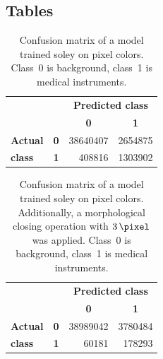 
\clearpage\onecolumn
\begin{appendices}
\section{Tables}

\begin{table}[ht]
    \centering
    \begin{tabular}{llrr}
    \toprule
    ~                & ~ & \multicolumn{2}{c}{\textbf{Predicted class}}\\
    ~                & ~ & \multicolumn{1}{c}{\textbf{0}} & \multicolumn{1}{c}{\textbf{1}} \\%
    \textbf{Actual}  & \multicolumn{1}{c}{\textbf{0}} & \num{38640407}  & \num{2654875} \\
    \textbf{class}   & \multicolumn{1}{c}{\textbf{1}} &   \num{408816}  & \num{1303902} \\ \bottomrule
    \end{tabular}
    \caption{Confusion matrix of a model trained soley on pixel colors.
             Class~0 is background, class~1 is medical instruments.}
    \label{table:cm-model-301}
\end{table}

\begin{table}[ht]
    \centering
    \begin{tabular}{llrr}
    \toprule
    ~                & ~ & \multicolumn{2}{c}{\textbf{Predicted class}}\\
    ~                & ~ & \multicolumn{1}{c}{\textbf{0}} & \multicolumn{1}{c}{\textbf{1}} \\%
    \textbf{Actual}  & \multicolumn{1}{c}{\textbf{0}} & \num{38989042}  & \num{3780484} \\
    \textbf{class}   & \multicolumn{1}{c}{\textbf{1}} &    \num{60181}  &  \num{178293} \\ \bottomrule
    \end{tabular}
    \caption{Confusion matrix of a model trained soley on pixel colors. Additionally,
             a morphological closing operation with $\SI{3}{\pixel}$ was applied.
             Class~0 is background, class~1 is medical instruments.}
    \label{table:cm-model-301-closing}
\end{table}


\end{appendices}
